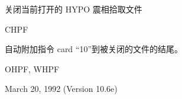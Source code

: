 \label{cmd:chpf}

关闭当前打开的 HYPO 震相拾取文件

CHPF

自动附加指令 card ``10''到被关闭的文件的结尾。

OHPF, WHPF

March 20, 1992 (Version 10.6e)


